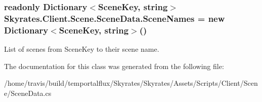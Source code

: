 \hypertarget{class_skyrates_1_1_client_1_1_scene_1_1_scene_data_a557060e5171ba38f4763c95b5e2b9c3c}{
\subsubsection[{Scene\-Names}]{\setlength{\rightskip}{0pt plus 5cm}readonly Dictionary$<${\bf Scene\-Key}, string$>$ Skyrates.\-Client.\-Scene.\-Scene\-Data.\-Scene\-Names = new Dictionary$<${\bf Scene\-Key}, string$>$()}}\label{class_skyrates_1_1_client_1_1_scene_1_1_scene_data_a557060e5171ba38f4763c95b5e2b9c3c}


List of scenes from Scene\-Key to their scene name. 



The documentation for this class was generated from the following file\-:\begin{DoxyCompactItemize}
\item 
/home/travis/build/temportalflux/\-Skyrates/\-Skyrates/\-Assets/\-Scripts/\-Client/\-Scene/Scene\-Data.\-cs\end{DoxyCompactItemize}
